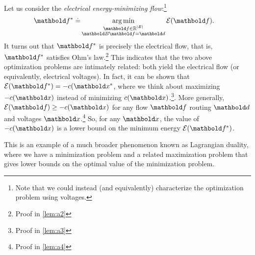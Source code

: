 Let us consider the \emph{electrical energy-minimizing flow}:\footnote{Note that we could instead (and equivalently) characterize the optimization problem using voltages.} \begin{align}
    \s{\vf} \defeq &\argmin_{\substack{\vf \in \R^{|\sE|} \\ \mB\vf = \vd}} \mathcal{E}(\vf). \label{eq:electrical_energy_minimizing_flow}
\end{align} It turns out that $\s{\vf}$ is precisely the electrical flow, that is, $\s{\vf}$ satisfies Ohm's law.\footnote{Proof in \cref{lem:a2}} This indicates that the two above optimization problems are intimately related: both yield the electrical flow (or equivalently, electrical voltages). In fact, it can be shown that $\mathcal{E}(\s{\vf}) = -c(\s{\vx}$, where we think about maximizing $-c(\vx)$ instead of minimizing $c(\vx)$.\footnote{Proof in \cref{lem:a3}}. More generally, $\mathcal{E}(\vf) \geq -c(\vx)$ for any flow $\vf$ routing $\vd$ and voltages $\vx$.\footnote{Proof in \cref{lem:a4}} So, for any $\vx$, the value of $-c(\vx)$ is a lower bound on the minimum energy $\mathcal{E}(\s{\vf})$.

This is an example of a much broader phenomenon known as Lagrangian duality, where we have a minimization problem and a related maximization problem that gives lower bounds on the optimal value of the minimization problem.